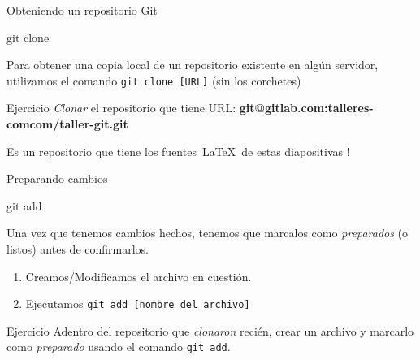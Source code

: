 \begin{frame}[t]{Obteniendo un repositorio Git}

    \begin{comando}
        git clone
    \end{comando}

    \pause
	\begin{block}{}
        Para obtener una copia local de un repositorio existente en algún servidor,
        utilizamos el comando \texttt{git clone [URL]} (sin los corchetes)
    \end{block}

    \pause
    \vspace{1em}
    \begin{ejercicio}{Ejercicio}
        \textit{Clonar} el repositorio que tiene URL: \textbf{git@gitlab.com:talleres-comcom/taller-git.git}

        \vspace{0.5em}
        Es un repositorio que tiene los fuentes\ \LaTeX\ de estas diapositivas !
    \end{ejercicio}
\end{frame}

\begin{frame}[t]{Preparando cambios}

    \begin{comando}
        git add
    \end{comando}

    \pause
    \begin{block}{}
        Una vez que tenemos cambios hechos, tenemos que marcalos como \textit{preparados} (o listos) antes de confirmarlos.
        \begin{enumerate}
            \item Creamos/Modificamos el archivo en cuestión.
            \item Ejecutamos \texttt{git add [nombre del archivo]}
        \end{enumerate}
    \end{block}

    \pause
    \vspace{1em}
    \begin{ejercicio}{Ejercicio}
        Adentro del repositorio que \textit{clonaron} recién, crear un archivo y
        marcarlo como \textit{preparado} usando el comando \texttt{git add}.
    \end{ejercicio}

\end{frame}

